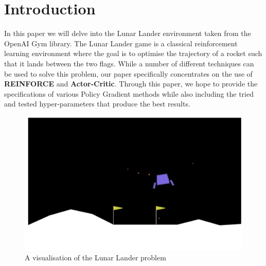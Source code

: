 \documentclass{article}
\begin{document}

\begin{abstract}

\end{abstract}

\section {Introduction}
In this paper we will delve into the Lunar Lander environment taken from the OpenAI Gym library. The Lunar Lander game is a classical reinforcement learning environment where the goal is to optimise the trajectory of a rocket such that it lands between the two flags.
 While a number of different techniques can be used to solve this problem, our paper specifically concentrates on the use of  \textbf{REINFORCE} and \textbf{Actor-Critic}. Through this paper, we hope to provide the specifications of various Policy Gradient methods while also including the tried and tested hyper-parameters that produce the best results.%

\begin{figure}[htbp]
\centering
\includegraphics[width=0.7\linewidth]{Report/images/visualisation.png}
\caption{\label{fig:Visualization of the Cart-pole} A visualisation of the Lunar Lander problem}
\end{figure}
\end{document}
